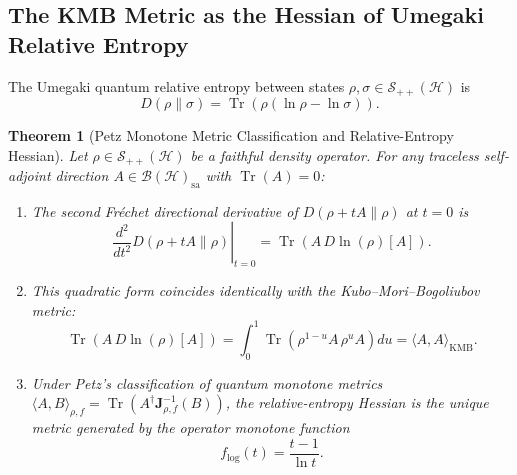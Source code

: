 \documentclass[11pt,a4paper]{article}
\theoremstyle{plain}
\newtheorem{theorem}{Theorem}[section]
\theoremstyle{definition}
\DeclareMathOperator{\Tr}{Tr}
\begin{document}
\subsection{The KMB Metric as the Hessian of Umegaki Relative Entropy}
The Umegaki quantum relative entropy between states $\rho, \sigma \in \mathcal{S}_{++}(\mathcal{H})$ is \cite{OhyaPetz1993,Petz2008}
\begin{equation}
D(\rho \parallel \sigma) = \Tr(\rho (\ln\rho - \ln\sigma)).
\end{equation}

\begin{theorem}[Petz Monotone Metric Classification and Relative-Entropy Hessian]
Let $\rho \in \mathcal{S}_{++}(\mathcal{H})$ be a faithful density operator. For any traceless self-adjoint direction $A \in \mathcal{B}(\mathcal{H})_{\mathrm{sa}}$ with $\Tr(A) = 0$:
\begin{enumerate}
    \item The second Fr\'{e}chet directional derivative of $D(\rho + t A \parallel \rho)$ at $t = 0$ is
    \begin{equation}
    \left. \frac{d^2}{dt^2} D(\rho + t A \parallel \rho) \right|_{t=0} = \Tr\left( A \, D\ln(\rho)[A] \right).
    \end{equation}
    \item This quadratic form coincides identically with the Kubo--Mori--Bogoliubov metric:
    \begin{equation}
    \Tr\left( A \, D\ln(\rho)[A] \right) = \int_0^1 \Tr\left( \rho^{1-u} A \, \rho^u A \right) du = \langle A, A \rangle_{\mathrm{KMB}}.
    \end{equation}
    \item Under Petz's classification of quantum monotone metrics $\langle A, B \rangle_{\rho, f} = \Tr(A^\dagger \mathbf{J}_{\rho, f}^{-1}(B))$, the relative-entropy Hessian is the unique metric generated by the operator monotone function
    \begin{equation}
    f_{\mathrm{log}}(t) = \frac{t - 1}{\ln t}.
    \end{equation}
\end{enumerate}
\end{theorem}
\end{document}
